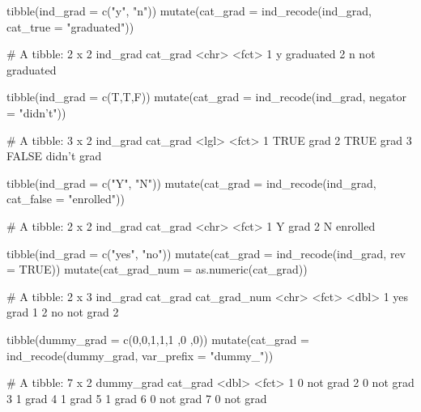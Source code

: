 \begin{Schunk}
\begin{Sinput}
tibble(ind_grad = c("y", "n")) %
  mutate(cat_grad  = ind_recode(ind_grad, 
                                cat_true = "graduated"))
\end{Sinput}
\begin{Soutput}
     # A tibble: 2 x 2
       ind_grad cat_grad     
       <chr>    <fct>        
     1 y        graduated    
     2 n        not graduated
\end{Soutput}
\begin{Sinput}
tibble(ind_grad = c(T,T,F)) %
  mutate(cat_grad  = ind_recode(ind_grad, negator = "didn't"))
\end{Sinput}
\begin{Soutput}
     # A tibble: 3 x 2
       ind_grad cat_grad   
       <lgl>    <fct>      
     1 TRUE     grad       
     2 TRUE     grad       
     3 FALSE    didn't grad
\end{Soutput}
\begin{Sinput}
tibble(ind_grad = c("Y", "N")) %
  mutate(cat_grad  = ind_recode(ind_grad, cat_false = "enrolled"))
\end{Sinput}
\begin{Soutput}
     # A tibble: 2 x 2
       ind_grad cat_grad
       <chr>    <fct>   
     1 Y        grad    
     2 N        enrolled
\end{Soutput}
\begin{Sinput}
tibble(ind_grad = c("yes", "no")) %
  mutate(cat_grad  = ind_recode(ind_grad, rev = TRUE)) %
  mutate(cat_grad_num = as.numeric(cat_grad))
\end{Sinput}
\begin{Soutput}
     # A tibble: 2 x 3
       ind_grad cat_grad cat_grad_num
       <chr>    <fct>           <dbl>
     1 yes      grad                1
     2 no       not grad            2
\end{Soutput}
\begin{Sinput}
tibble(dummy_grad = c(0,0,1,1,1 ,0 ,0)) %
  mutate(cat_grad  = ind_recode(dummy_grad, var_prefix = "dummy_"))
\end{Sinput}
\begin{Soutput}
     # A tibble: 7 x 2
       dummy_grad cat_grad
            <dbl> <fct>   
     1          0 not grad
     2          0 not grad
     3          1 grad    
     4          1 grad    
     5          1 grad    
     6          0 not grad
     7          0 not grad
\end{Soutput}
\end{Schunk}

